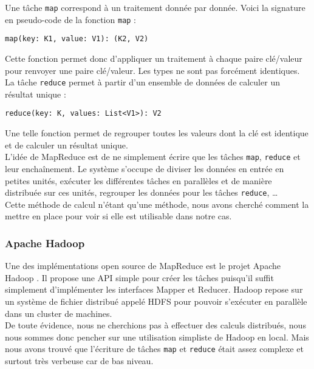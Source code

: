Une tâche \verb+map+ correspond à un traitement donnée par donnée. Voici la signature en pseudo-code de la fonction \verb+map+ :

\begin{center}
 \verb+map(key: K1, value: V1): (K2, V2)+
\end{center}

Cette fonction permet donc d'appliquer un traitement à chaque paire clé/valeur pour renvoyer une paire clé/valeur. Les types ne sont pas forcément identiques. La tâche \verb+reduce+ permet à partir d'un ensemble de données de calculer un résultat unique :

\begin{center}
 \verb+reduce(key: K, values: List<V1>): V2+
\end{center}

Une telle fonction permet de regrouper toutes les valeurs dont la clé est identique et de calculer un résultat unique.\\

L'idée de MapReduce est de ne simplement écrire que les tâches \verb+map+, \verb+reduce+ et leur enchaînement. Le système s'occupe de diviser les données en entrée en petites unités, exécuter les différentes tâches en parallèles et de manière distribuée sur ces unités, regrouper les données pour les tâches \verb+reduce+, \dots{}\\

Cette méthode de calcul n'étant qu'une méthode, nous avons cherché comment la mettre en place pour voir si elle est utilisable dans notre cas.

\subsubsection{Apache Hadoop}

Une des implémentations open source de MapReduce est le projet Apache Hadoop \cite{hadoop}. Il propose une API simple pour créer les tâches puisqu'il suffit simplement d'implémenter les interfaces Mapper et Reducer. Hadoop repose sur un système de fichier distribué appelé HDFS pour pouvoir s'exécuter en parallèle dans un cluster de machines.\\

De toute évidence, nous ne cherchions pas à effectuer des calculs distribués, nous nous sommes donc pencher sur une utilisation simpliste de Hadoop en local. Mais nous avons trouvé que l'écriture de tâches \verb+map+ et \verb+reduce+ était assez complexe et surtout très verbeuse car de bas niveau.\\

